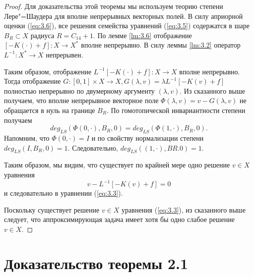 \begin{proof}
    Для доказательства этой теоремы мы используем теорию степени Лере"=Шаудера для вполне непрерывных 
    векторных полей. В силу априорной оценки (\ref{eq:3.6}), все решения семейства уравнений (\ref{eq:3.5}) содержатся в шаре 
    $B_R \subset X$ радиуса $R = C_{14} +1$. По лемме \ref{lm:3.6} отображение $[-K (\cdot) + f]: X \rightarrow X^*$
    вполне непрерывно. В силу леммы \ref{lm:3.2} оператор $L^{-1}: X^*\rightarrow X$ непрерывен.

    Таким образом, отображение $L^{-1}[-K (\cdot) + f]: X \rightarrow X$ вполне непрерывно.  
    Тогда отображение $G:[0, 1] \times X\rightarrow X, G (\lambda, v) = \lambda L^{-1}[- K (v) + f]$ 
    полностью непрерывно по двумерному аргументу $(\lambda, v)$.  Из сказанного выше получаем, что вполне непрерывное 
    векторное поле $\Phi(\lambda, v) = v - G (\lambda, v)$ не обращается в нуль на границе $B_R$. По гомотопической 
    инвариантности степени получаем
    $$deg_{LS}(\Phi(0,\cdot),B_R,0)=deg_{LS}(\Phi(1,\cdot),B_R,0).$$
    Напомним, что $\Phi(0,\cdot) = I$ и по свойству нормализации степени $deg_{LS} (I, B_R, 0) = 1$. 
    Следовательно, $deg_{LS} ((1,\cdot), BR.0) = 1$. 
    
    Таким образом, мы видим, что существует по крайней мере одно решение $v\in X$ уравнения
    $$v-L^{-1}[-K(v)+f]=0$$
    и следовательно в уравнении (\ref{eq:3.3}).

    Поскольку существует решение $v\in X$ уравнения (\ref{eq:3.3}), из сказанного выше следует, 
    что аппроксимирующая задача имеет хотя бы одно слабое решение $v\in X$.
\end{proof}

\section{Доказательство теоремы 2.1}


